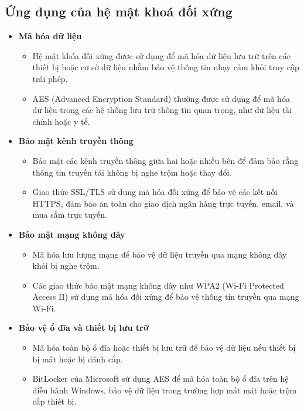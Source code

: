 \subsection{Ứng dụng của hệ mật khoá đối xứng}
\begin{itemize}
    \item \textbf{Mã hóa dữ liệu}
    \begin{itemize}
        \item  Hệ mật khóa đối xứng được sử dụng để mã hóa dữ liệu lưu trữ trên các thiết bị hoặc cơ sở dữ liệu nhằm bảo vệ thông tin nhạy cảm khỏi truy cập trái phép.
        \item AES (Advanced Encryption Standard) thường được sử dụng để mã hóa dữ liệu trong các hệ thống lưu trữ thông tin quan trọng, như dữ liệu tài chính hoặc y tế.
    \end{itemize}

    \item \textbf{Bảo mật kênh truyền thông}
    \begin{itemize}
        \item  Bảo mật các kênh truyền thông giữa hai hoặc nhiều bên để đảm bảo rằng thông tin truyền tải không bị nghe trộm hoặc thay đổi.
        \item Giao thức SSL/TLS sử dụng mã hóa đối xứng để bảo vệ các kết nối HTTPS, đảm bảo an toàn cho giao dịch ngân hàng trực tuyến, email, và mua sắm trực tuyến.
    \end{itemize}

    \item \textbf{Bảo mật mạng không dây}
    \begin{itemize}
        \item  Mã hóa lưu lượng mạng để bảo vệ dữ liệu truyền qua mạng không dây khỏi bị nghe trộm.
        \item  Các giao thức bảo mật mạng không dây như WPA2 (Wi-Fi Protected Access II) sử dụng mã hóa đối xứng để bảo vệ thông tin truyền qua mạng Wi-Fi.
    \end{itemize}

    \item \textbf{Bảo vệ ổ đĩa và thiết bị lưu trữ}
    \begin{itemize}
        \item  Mã hóa toàn bộ ổ đĩa hoặc thiết bị lưu trữ để bảo vệ dữ liệu nếu thiết bị bị mất hoặc bị đánh cắp.
        \item  BitLocker của Microsoft sử dụng AES để mã hóa toàn bộ ổ đĩa trên hệ điều hành Windows, bảo vệ dữ liệu trong trường hợp mất mát hoặc trộm cắp thiết bị.
    \end{itemize}


\end{itemize}
